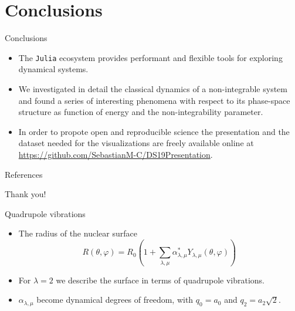 \documentclass{beamer}
\begin{document}

\section{Conclusions}

\begin{frame}{Conclusions}
	\begin{itemize}
		\item The \texttt{Julia} ecosystem provides performant and
		flexible tools for exploring dynamical systems.
		\item We investigated in detail the classical dynamics of a
		non-integrable system and found a series of interesting
		phenomena with respect to its phase-space structure as
		function of energy and the non-integrability parameter.
		\item In order to propote open and reproducible\cite{singularity-2017,white2018datadepsjl} science the presentation and the dataset needed for the visualizations
		are freely available online at \url{https://github.com/SebastianM-C/DS19Presentation}.
	\end{itemize}
\end{frame}


\begin{frame}[allowframebreaks]{References}
	\small
  
  

\end{frame}


\begin{frame}[standout]
Thank you!
\end{frame}

\appendix


\begin{frame}{Quadrupole vibrations}
	\begin{itemize}
    \item The radius of the nuclear surface
    \[
      R(\theta, \varphi) = R_0 \left( 1 + \sum_{\lambda, \mu}
          \alpha_{\lambda,\mu}^* Y_{\lambda,\mu}(\theta, \varphi) \right)
    \]
    \item For \(\lambda = 2\) we describe the surface in terms of
    quadrupole vibrations.
    \item \(\alpha_{\lambda,\mu}\) become dynamical degrees of freedom,
		with \(q_0 = a_0\) and \(q_2 = a_2\sqrt{2}\).
  \end{itemize}
\end{frame}
\end{document}
